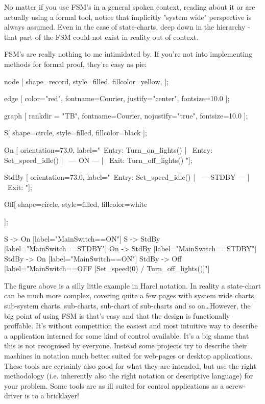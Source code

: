 No matter if you use FSM's in a general spoken context, reading about it or are actually using a formal tool, notice that implicitly "system wide" perspective is always assumed. Even in the case of state-charts, deep down in the hierarchy - that part of the FSM could not exist in reality out of context.

FSM's are really nothing to me intimidated by. If you're not into implementing methods for formal proof, they're easy as pie:

\begin{dotpic}
   node [
      shape=record,
      style=filled,
      fillcolor=yellow,
   ];

   edge [
      color="red",
      fontname=Courier,
      justify="center",
      fontsize=10.0
   ];

   graph [
      rankdir = "TB",
      fontname=Courier,
      nojustify="true",
      fontsize=10.0
   ];

   S[
      shape=circle,
      style=filled,
      fillcolor=black
   ];

   On [ orientation=73.0, label="{\
     Entry:  Turn_on_lights()       | \
     Entry:  Set_speed_idle()       | \	
      --- ON ---  | \
     Exit:  Turn_off_lights() }"];

   StdBy [ orientation=73.0, label="{\
     Entry:  Set_speed_idle()       | \
      --- STDBY ---  | \
     Exit: }"];

   Off[
      shape=circle,
      style=filled,
      fillcolor=white

   ];
   

    S -> On    [label="MainSwitch==ON"]
    S -> StdBy [label="MainSwitch==STDBY"]
    On -> StdBy [label="MainSwitch==STDBY"]
    StdBy -> On [label="MainSwitch==ON"]
    StdBy -> Off [label="MainSwitch==OFF [Set_speed(0) / Turn_off_lights()]"]

\end{dotpic}
 
The figure above is a silly little example in Harel notation. In reality a state-chart can be much more complex, covering quite a few pages with system wide charts, sub-system charts, sub-charts, sub-chart of sub-charts and so on\ldots However, the big point of using FSM is that's easy and that the design is functionally proffable. It's without competition the easiest and most intuitive way to describe a application interned for some kind of control available. It's a big shame that this is not recognised by everyone. Instead some projects try to describe their mashines in notation much better suited for web-pages or desktop applications. These tools are certainly also good for what they are intended, but use the right methodology (i.e. inherently also the right notation or descriptive language) for your problem. Some tools are as ill suited for control applications as a screw-driver is to a bricklayer!

